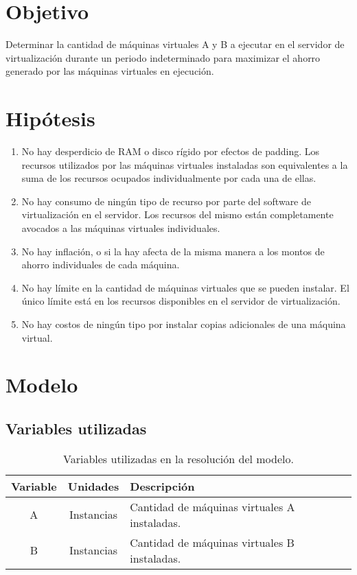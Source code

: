 \documentclass[a4paper,11pt]{article}
\begin{document}
\section{Objetivo}

Determinar la cantidad de máquinas virtuales A y B a ejecutar en el servidor de
virtualización durante un periodo indeterminado para maximizar el ahorro
generado por las máquinas virtuales en ejecución.

\section{Hipótesis}

\begin{enumerate}

  \item No hay desperdicio de RAM o disco rígido por efectos de padding. Los
    recursos utilizados por las máquinas virtuales instaladas son equivalentes
    a la suma de los recursos ocupados individualmente por cada una de ellas.

  \item No hay consumo de ningún tipo de recurso por parte del software de
    virtualización en el servidor. Los recursos del mismo están completamente
    avocados a las máquinas virtuales individuales.

  \item No hay inflación, o si la hay afecta de la misma manera a los montos de
    ahorro individuales de cada máquina.

  \item No hay límite en la cantidad de máquinas virtuales que se pueden
    instalar. El único límite está en los recursos disponibles en el servidor
    de virtualización.

  \item No hay costos de ningún tipo por instalar copias adicionales de una
    máquina virtual.

\end{enumerate}

\section{Modelo}

\subsection{Variables utilizadas}

\begin{table}[h!t]
  \centering
  \begin{tabular}{ | c | c | p{7cm} | }
    \hline
    \textbf{Variable} & \textbf{Unidades} & \textbf{Descripción} \\ \hline
                    A & Instancias        & Cantidad de máquinas virtuales A instaladas. \\ \hline
                    B & Instancias        & Cantidad de máquinas virtuales B instaladas. \\ \hline
  \end{tabular}
  \caption{Variables utilizadas en la resolución del modelo.}
\end{table}
\end{document}

